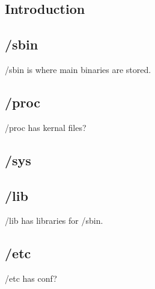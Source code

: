 
\subsection{Introduction}
 
\subsection{/sbin}
/sbin is where main binaries are stored.

\subsection{/proc}
/proc has kernal files?
 
\subsection{/sys}

\subsection{/lib}
/lib has libraries for /sbin.
 
\subsection{/etc}
/etc has conf?

